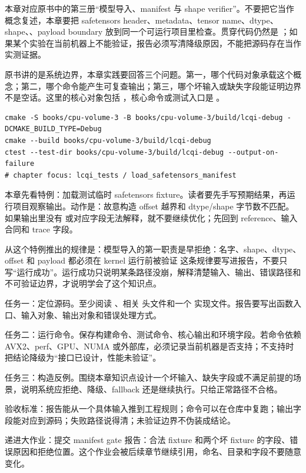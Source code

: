 
本章对应原书中的第三册“模型导入、manifest 与 shape verifier”。不要把它当作概念复述，本章要把 safetensors header、metadata、tensor name、dtype、shape、、payload boundary 放到同一个可运行项目里检查。贯穿代码仍然是 ；如果某个实验在当前机器上不能验证，报告必须写清降级原因，不能把源码存在当作实测证据。


原书讲的是系统边界，本章实践要回答三个问题。第一，哪个代码对象承载这个概念；第二，哪个命令能产生可复查输出；第三，哪个坏输入或缺失字段能证明边界不是空话。这里的核心对象包括 ，核心命令或测试入口是 。

\begin{lstlisting}[numbers=none,caption={第 9 章实践：模型导入、manifest 与 Shape Verifier 的最小命令入口}]
cmake -S books/cpu-volume-3 -B books/cpu-volume-3/build/lcqi-debug -DCMAKE_BUILD_TYPE=Debug
cmake --build books/cpu-volume-3/build/lcqi-debug
ctest --test-dir books/cpu-volume-3/build/lcqi-debug --output-on-failure
# chapter focus: lcqi_tests / load_safetensors_manifest
\end{lstlisting}


本章先看特例：加载测试临时 safetensors fixture。读者要先手写预期结果，再运行项目观察输出。动作是：故意构造 offset 越界和 dtype/shape 字节数不匹配。如果输出里没有  或对应字段无法解释，就不要继续优化；先回到 reference、输入合同和 trace 字段。

从这个特例推出的规律是：模型导入的第一职责是早拒绝：名字、shape、dtype、offset 和 payload 都必须在 kernel 运行前被验证 这条规律要写进报告，不要只写“运行成功”。运行成功只说明某条路径没崩，解释清楚输入、输出、错误路径和不可验证边界，才说明学会了这个知识点。


任务一：定位源码。至少阅读 、相关  头文件和一个  实现文件。报告要写出函数入口、输入对象、输出对象和错误处理方式。

任务二：运行命令。保存构建命令、测试命令、核心输出和环境字段。若命令依赖 AVX2、perf、GPU、NUMA 或外部库，必须记录当前机器是否支持；不支持时把结论降级为“接口已设计，性能未验证”。

任务三：构造反例。围绕本章知识点设计一个坏输入、缺失字段或不满足前提的场景，说明系统应拒绝、降级、fallback 还是继续执行。只给正常路径不合格。


验收标准：报告能从一个具体输入推到工程规则；命令可以在仓库中复跑；输出字段能对应到源码；失败路径说得清；未验证边界不伪装成结论。

递进大作业：提交 manifest gate 报告：合法 fixture 和两个坏 fixture 的字段、错误原因和拒绝位置。这个作业会被后续章节继续引用，命名、目录和字段不要随意变化。
